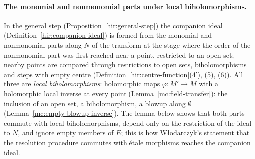 \paragraph{The monomial and nonmonomial parts under local biholomorphisms.} In the general step (Proposition~\ref{hir:general-step}) the companion ideal
(Definition~\ref{hir:companion-ideal}) is formed from the monomial and nonmonomial parts along \(N\) of the transform at the stage where the order of the
nonmonomial part was first reached near a point, restricted to an open set; nearby points are compared through restrictions to open sets, biholomorphisms and
steps with empty centre (Definition~\ref{hir:centre-function}(4'), (5), (6)). All three are \emph{local biholomorphisms}: holomorphic maps \(\varphi\colon M'\to M\)
with a holomorphic local inverse at every point (Lemma~\ref{mc:field-transfer}): the inclusion of an open set, a biholomorphism, a blowup along \(\emptyset\)
(Lemma~\ref{mc:empty-blowup-inverse}). The lemma below shows that both parts commute with local biholomorphisms, depend only on the restriction of the ideal to
\(N\), and ignore empty members of \(E\); this is how Włodarczyk's statement that the resolution procedure commutes with étale morphisms reaches the companion ideal.

